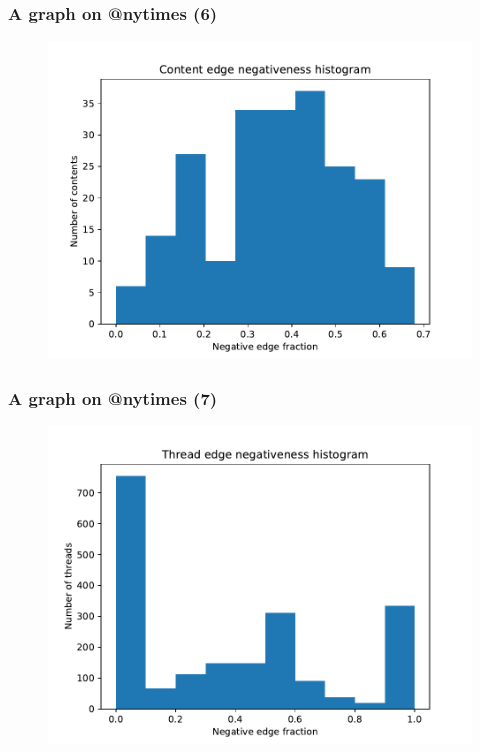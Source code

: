 \documentclass{beamer}
\begin{document}
\begin{frame}[c]
    \frametitle{A graph on @nytimes (6)}
    \begin{figure}[htpb]
        \centering
        \includegraphics[width=0.8\linewidth]{out/nytimes400/neg-fraction-content-hist.pdf}
    \end{figure}
\end{frame}


\begin{frame}[c]
    \frametitle{A graph on @nytimes (7)}

    \begin{figure}[htpb]
        \centering
        \includegraphics[width=0.8\linewidth]{out/nytimes400/neg-fraction-thread-hist.pdf}
    \end{figure}
\end{frame}
\end{document}
